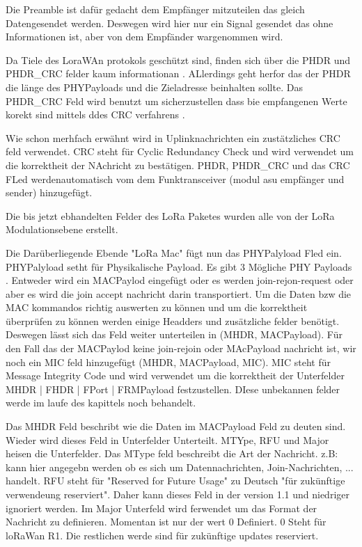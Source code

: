 \documentclass[a4paper,12pt]{article}
\begin{document}
            Die Preamble ist dafür gedacht dem Empfänger mitzuteilen das gleich Datengesendet werden. Deswegen wird hier nur ein Signal gesendet das ohne Informationen ist, aber von dem Empfänder wargenommen wird.

            Da Tiele des LoraWAn protokols geschützt sind, finden sich über die PHDR und PHDR\_CRC felder kaum informationan . ALlerdings geht herfor das der PHDR die länge des PHYPayloads und die Zieladresse beinhalten sollte. 
            Das PHDR\_CRC Feld wird benutzt um sicherzustellen dass bie empfangenen Werte korekt sind mittels ddes CRC verfahrens .
            
            Wie schon merhfach erwähnt wird in Uplinknachrichten ein zustätzliches CRC feld verwendet. CRC steht für Cyclic Redundancy Check und wird verwendet um die korrektheit der NAchricht zu bestätigen. PHDR, PHDR\_CRC und das CRC FLed werdenautomatisch vom dem Funktransceiver (modul asu empfänger und sender) hinzugefügt.
            
            Die bis jetzt ebhandelten Felder des LoRa Paketes wurden alle von der LoRa Modulationsebene erstellt.

            Die Darüberliegende Ebende "LoRa Mac" fügt nun das PHYPalyload Fled ein. PHYPalyload setht für Physikalische Payload. Es gibt 3 Mögliche PHY Payloads . Entweder wird ein MACPaylod eingefügt oder es werden join-rejon-request oder aber es wird die join accept nachricht darin transportiert. 
            Um die Daten bzw die MAC kommandos richtig auswerten zu können und um die korrektheit überprüfen zu können werden einige Headders und zusätzliche felder benötigt. Deswegen lässt sich das Feld weiter unterteilen in (MHDR, MACPayload). Für den Fall das der MACPaylod keine join-rejoin oder MAcPayload nachricht ist,
            wir noch ein MIC feld hinzugefügt (MHDR, MACPayload, MIC). MIC steht für Message Integrity Code und wird verwendet um die korrektheit der Unterfelder MHDR | FHDR | FPort | FRMPayload festzustellen. DIese unbekannen felder werde im laufe des kapittels noch behandelt.

            Das MHDR Feld beschribt wie die Daten im MACPayload Feld zu deuten sind. Wieder wird dieses Feld in Unterfelder Unterteilt. MTYpe, RFU und Major heisen die Unterfelder. Das MType feld beschreibt die Art der Nachricht. z.B: kann hier angegebn werden ob es sich um Datennachrichten, Join-Nachrichten, ... handelt. 
            RFU steht für "Reserved for Future Usage" zu Deutsch "für zukünftige verwendeung reserviert". 
            Daher kann dieses Feld in der version 1.1 und niedriger ignoriert werden.
            Im Major Unterfeld wird ferwendet um das Format der Nachricht zu definieren. Momentan ist nur der wert 0 Definiert. 0 Steht für loRaWan R1. Die restlichen werde sind für zukünftige updates reserviert.
\end{document}

